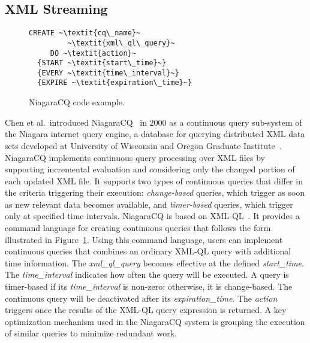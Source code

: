 \subsection{XML Streaming}\label{sec:xml} %

\begin{figure}[!h]
\begin{lstlisting}
CREATE ~\textit{cq\_name}~
         ~\textit{xml\_ql\_query}~
     DO ~\textit{action}~
  {START ~\textit{start\_time}~}
  {EVERY ~\textit{time\_interval}~}
  {EXPIRE ~\textit{expiration\_time}~}
\end{lstlisting}
\vspace*{-4mm}
\caption{\label{fig:Niagra}NiagaraCQ code example.}
\end{figure}

Chen et al.\ introduced NiagaraCQ~\cite{chen_et_al_2000} in 2000 as a
continuous query sub-system of the Niagara internet query engine, a
data\-base for querying distributed XML data sets developed at
University of Wisconsin and Oregon Graduate
Institute~\cite{naughton2001niagara}. NiagaraCQ implements continuous
query processing over XML files by supporting incremental evaluation
and considering only the changed portion of each updated XML file. It
supports two types of continuous queries that differ in the criteria
triggering their execution: \emph{change-based} queries, which trigger
as soon as new relevant data becomes available, and \emph{timer-based}
queries, which trigger only at specified time intervals.  NiagaraCQ is
based on XML-QL~\cite{deutsch1999query}.  It provides a command
language for creating continuous queries that follows the form
illustrated in Figure~\ref{fig:Niagra}. Using this command language,
users can implement continuous queries that combines an ordinary
XML-QL query with additional time information.  The
\textsf{\small\textit{xml\_ql\_query}} becomes effective at the
defined \textsf{\small\textit{start\_time}}.  The
\textsf{\small\textit{time\_interval}} indicates how often the query
will be executed. A query is timer-based if its
\textsf{\small\textit{time\_interval}} is non-zero; otherwise, it is
change-based.  The continuous query will be deactivated after its
\textsf{\small\textit{expiration\_time}}. The
\textsf{\small\textit{action}} triggers once the results of the XML-QL
query expression is returned.  A key optimization mechanism used in
the NiagaraCQ system is grouping the execution of similar queries to
minimize redundant work.

